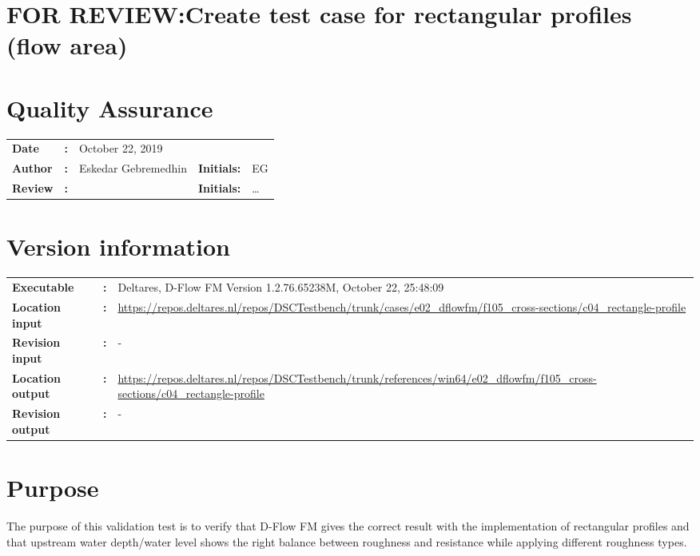 

\section{FOR REVIEW:Create test case for rectangular profiles (flow area)}
\newrefsegment

\section*{Quality Assurance}
\begin{tabular}{@{}p{27mm}@{}p{0mm}p{\textwidth-52mm-48pt}p{15mm}p{10mm}}
\textbf{Date} & \textbf{:} &  October 22, 2019   \\ 
\textbf{Author} & \textbf{:} & Eskedar Gebremedhin  & \textbf{Initials:} & EG \\
\textbf{Review} & \textbf{:} &   & \textbf{Initials:} & \ldots 
\end{tabular}

\section*{Version information}
{{
\begin{tabular}{@{}p{27mm}@{}p{0mm}p{\textwidth-27mm-24pt}}
\textbf{Executable}   & \textbf{:} & Deltares, D-Flow FM Version 1.2.76.65238M, October 22, 25:48:09  \\
\textbf{Location input}     & \textbf{:} & \url{https://repos.deltares.nl/repos/DSCTestbench/trunk/cases/e02_dflowfm/f105_cross-sections/c04_rectangle-profile} \\
\textbf{Revision input} & \textbf{:} & - \\
\textbf{Location output}     & \textbf{:} & \url{https://repos.deltares.nl/repos/DSCTestbench/trunk/references/win64/e02_dflowfm/f105_cross-sections/c04_rectangle-profile} \\
\textbf{Revision output} & \textbf{:} & -
\end{tabular}
}}

\section*{Purpose}
The purpose of this validation test is to verify that D-Flow FM gives the correct result with the implementation of rectangular profiles and that upstream water depth/water level shows the right balance between roughness and resistance while applying different roughness types.

